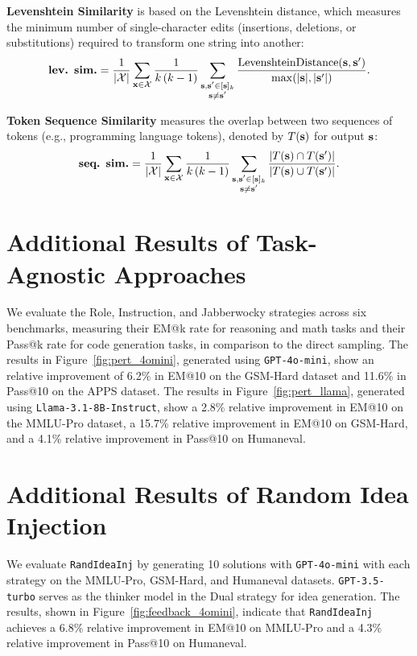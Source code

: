 \textbf{Levenshtein Similarity} is based on the Levenshtein distance, which measures the minimum number of single-character edits (insertions, deletions, or substitutions) required to transform one string into another: 
$$
\textbf{lev. sim.} = \frac{1}{|\mathcal{X}|} \sum_{\mathbf{x} \in \mathcal{X}} \frac{1}{k\left(k-1\right)} \sum_{\substack{{\mathbf{s}}, {\mathbf{s}}^{\prime} \in [\mathbf{s}]_k \\ {\mathbf{s}} \neq {\mathbf{s}}^{\prime}}} \frac{\operatorname{Levenshtein Distance}(\mathbf{s}, \mathbf{s}') }{\max(|\mathbf{s}|, |\mathbf{s}'|)}.
$$

\textbf{Token Sequence Similarity} measures the overlap between two sequences of tokens (e.g., programming language tokens), denoted by $T(\mathbf{s})$ for output $\mathbf{s}$: 
$$
\textbf{seq. sim.} = \frac{1}{|\mathcal{X}|} \sum_{\mathbf{x} \in \mathcal{X}} \frac{1}{k\left(k-1\right)} \sum_{\substack{{\mathbf{s}}, {\mathbf{s}}^{\prime} \in [\mathbf{s}]_k \\ {\mathbf{s}} \neq {\mathbf{s}}^{\prime}}} \frac{|T(\mathbf{s}) \cap T(\mathbf{s}')|}{|T(\mathbf{s}) \cup T(\mathbf{s}')|}.
$$



\section{Additional Results of Task-Agnostic Approaches}
\label{sec:appendix_task_agnostic}
We evaluate the Role, Instruction, and Jabberwocky strategies across  six benchmarks, measuring their EM@k rate for reasoning and math tasks and their Pass@k rate for code generation tasks, in comparison to the direct sampling. The results in Figure~\ref{fig:pert_4omini}, generated using \texttt{GPT-4o-mini}, show an relative improvement of 6.2\% in EM@10 on the GSM-Hard dataset and 11.6\% in Pass@10 on the APPS dataset. The results in Figure~\ref{fig:pert_llama}, generated using \texttt{Llama-3.1-8B-Instruct}, show a 2.8\% relative improvement in EM@10 on the MMLU-Pro dataset, a 15.7\% relative improvement in EM@10 on GSM-Hard, and a 4.1\% relative improvement in Pass@10 on Humaneval.



\section{Additional Results of Random Idea Injection}
\label{appendix: randideainj}
We evaluate \texttt{RandIdeaInj} by generating 10 solutions with \texttt{GPT-4o-mini} with each strategy on the MMLU-Pro, GSM-Hard, and Humaneval datasets. \texttt{GPT-3.5-turbo} serves as the thinker model in the Dual strategy for idea generation. The results, shown in Figure~\ref{fig:feedback_4omini}, indicate that \texttt{RandIdeaInj} achieves a 6.8\% relative improvement in EM@10 on MMLU-Pro and a 4.3\% relative improvement in Pass@10 on Humaneval.

